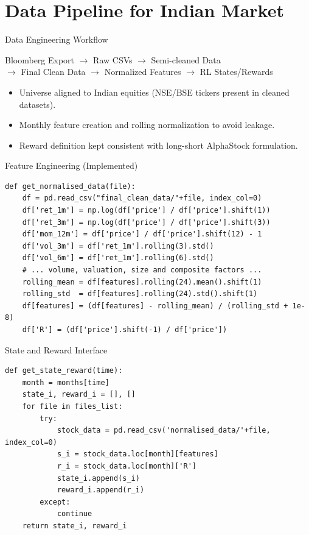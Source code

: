 \documentclass[aspectratio=169]{beamer}
\begin{document}
\section{Data Pipeline for Indian Market}
\begin{frame}{Data Engineering Workflow}
  \begin{center}
  \large
  Bloomberg Export $\rightarrow$ Raw CSVs $\rightarrow$ Semi-cleaned Data\\
  $\rightarrow$ Final Clean Data $\rightarrow$ Normalized Features $\rightarrow$ RL States/Rewards
  \end{center}
  \vspace{0.4cm}
  \begin{itemize}
    \item Universe aligned to Indian equities (NSE/BSE tickers present in cleaned datasets).
    \item Monthly feature creation and rolling normalization to avoid leakage.
    \item Reward definition kept consistent with long-short AlphaStock formulation.
  \end{itemize}
\end{frame}

\begin{frame}[fragile]{Feature Engineering (Implemented)}
\begin{lstlisting}[style=mypython]
def get_normalised_data(file):
    df = pd.read_csv("final_clean_data/"+file, index_col=0)
    df['ret_1m'] = np.log(df['price'] / df['price'].shift(1))
    df['ret_3m'] = np.log(df['price'] / df['price'].shift(3))
    df['mom_12m'] = df['price'] / df['price'].shift(12) - 1
    df['vol_3m'] = df['ret_1m'].rolling(3).std()
    df['vol_6m'] = df['ret_1m'].rolling(6).std()
    # ... volume, valuation, size and composite factors ...
    rolling_mean = df[features].rolling(24).mean().shift(1)
    rolling_std  = df[features].rolling(24).std().shift(1)
    df[features] = (df[features] - rolling_mean) / (rolling_std + 1e-8)
    df['R'] = (df['price'].shift(-1) / df['price'])
\end{lstlisting}
\end{frame}

\begin{frame}[fragile]{State and Reward Interface}
\begin{lstlisting}[style=mypython]
def get_state_reward(time):
    month = months[time]
    state_i, reward_i = [], []
    for file in files_list:
        try:
            stock_data = pd.read_csv('normalised_data/'+file, index_col=0)
            s_i = stock_data.loc[month][features]
            r_i = stock_data.loc[month]['R']
            state_i.append(s_i)
            reward_i.append(r_i)
        except:
            continue
    return state_i, reward_i
\end{lstlisting}
\end{frame}
\end{document}
